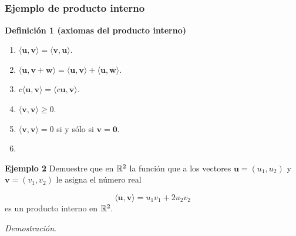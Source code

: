 
\subsection{}

\begin{frame}\frametitle{Ejemplo de producto interno}
	
	\begin{block}{\textbf{Definición 1 (axiomas del producto interno)}}	
		\begin{multicols}{2}		
			\begin{enumerate}			
				\justifying
				\item[\labelname{$a$}] $\langle \mathbf{u}, \mathbf{v}\rangle = \langle \mathbf{v}, \mathbf{u}\rangle$. \\%
				\item[\labelname{$b$}] $\langle \mathbf{u}, \mathbf{v}+\mathbf{w}\rangle 
				= \langle \mathbf{u}, \mathbf{v}\rangle + \langle \mathbf{u}, \mathbf{w}\rangle$. \\%
				\item[\labelname{$c$}] $c\langle \mathbf{u}, \mathbf{v}\rangle = \langle c\mathbf{u}, \mathbf{v}\rangle$.\\
				\columnbreak
				\item[\labelname{$d$}] $\langle \mathbf{v}, \mathbf{v}\rangle \geq 0 $. 
				\item[\labelname{$e$}] $\langle \mathbf{v}, \mathbf{v}\rangle = 0 $ si y sólo si $\mathbf{v}=\mathbf{0}$. 
				\item[]
			\end{enumerate}		
		\end{multicols}
		
	\end{block}
	
	\begin{ej}{\textbf{Ejemplo 2}}\justifying
		Demuestre que en $\mathbb{R}^2$ la función que a los vectores $\mathbf{u}=(u_1,u_2)$ y 
		$\mathbf{v}=(v_1,v_2)$ le asigna el número real
		
		\vspace{-4mm}
		\[
		\langle \mathbf{u}, \mathbf{v}\rangle = u_1v_1 + 2u_2v_2
		\]
		es un producto interno en $\mathbb{R}^2$.
	\end{ej}
	\textit{Demostración}.
	
\end{frame}

